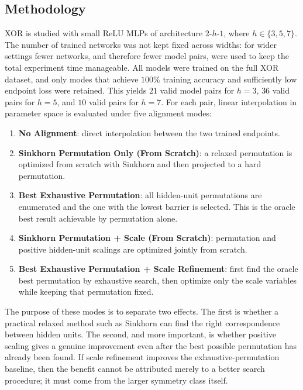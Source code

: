 \documentclass[11pt,a4paper]{report}
\begin{document}
\subsection{Methodology}
\label{subsec:xor_scale_methodology}

XOR is studied with small ReLU MLPs of architecture \(2\)-\(h\)-\(1\), where \(h \in \{3,5,7\}\). The number of trained networks was not kept fixed across widths: for wider settings fewer networks, and therefore fewer model pairs, were used to keep the total experiment time manageable. All models were trained on the full XOR dataset, and only modes that achieve \(100\%\) training accuracy and sufficiently low endpoint loss were retained. This yields \(21\) valid model pairs for \(h=3\), \(36\) valid pairs for \(h=5\), and \(10\) valid pairs for \(h=7\). For each pair, linear interpolation in parameter space is evaluated under five alignment modes:
\begin{enumerate}
    \item \textbf{No Alignment}: direct interpolation between the two trained endpoints.
    \item \textbf{Sinkhorn Permutation Only (From Scratch)}: a relaxed permutation is optimized from scratch with Sinkhorn and then projected to a hard permutation.
    \item \textbf{Best Exhaustive Permutation}: all hidden-unit permutations are enumerated and the one with the lowest barrier is selected. This is the oracle best result achievable by permutation alone.
    \item \textbf{Sinkhorn Permutation + Scale (From Scratch)}: permutation and positive hidden-unit scalings are optimized jointly from scratch.
    \item \textbf{Best Exhaustive Permutation + Scale Refinement}: first find the oracle best permutation by exhaustive search, then optimize only the scale variables while keeping that permutation fixed.
\end{enumerate}

The purpose of these modes is to separate two effects. The first is whether a practical relaxed method such as Sinkhorn can find the right correspondence between hidden units. The second, and more important, is whether positive scaling gives a genuine improvement even after the best possible permutation has already been found. If scale refinement improves the exhaustive-permutation baseline, then the benefit cannot be attributed merely to a better search procedure; it must come from the larger symmetry class itself.
\end{document}

